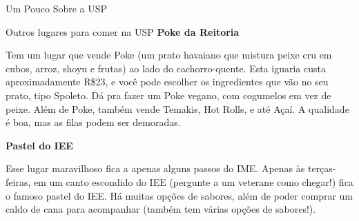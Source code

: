 \begin{secao}{Um Pouco Sobre a USP}
\begin{subsecao}{Outros lugares para comer na USP}
{\bf Poke da Reitoria}

Tem um lugar que vende Poke (um prato havaiano que mistura peixe cru em cubos,
arroz, shoyu e frutas) ao lado do cachorro-quente. Esta iguaria custa
aproximadamente R\$23, e você pode escolher os ingredientes que vão no seu prato,
tipo Spoleto. Dá pra fazer um Poke vegano, com cogumelos em vez de peixe. Além de
Poke, também vende Temakis, Hot Rolls, e até Açaí. A qualidade é boa, mas as filas
podem ser demoradas.

{\bf Pastel do IEE}

Esse lugar maravilhoso fica a apenas alguns passos do IME. Apenas às terças-feiras,
em um canto escondido do IEE (pergunte a um veterane como chegar!) fica o famoso pastel do IEE.
Há muitas opções de sabores, além de poder comprar um caldo de cana para acompanhar (também tem várias opções de sabores!).

\end{subsecao}

\end{secao}
